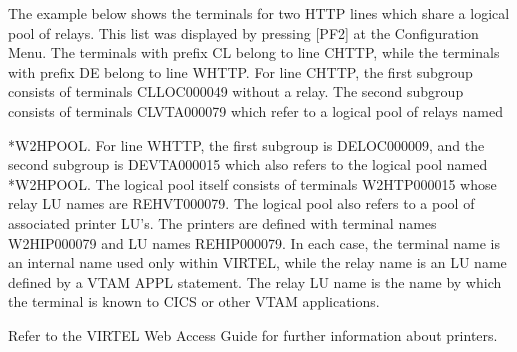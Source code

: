\documentclass[letterpaper,10pt,english]{sphinxmanual}
\begin{document}
\sphinxAtStartPar
The example below shows the terminals for two HTTP lines which share a logical pool of relays. This list was displayed by pressing {[}PF2{]} at the Configuration Menu. The terminals with prefix CL belong to line C\sphinxhyphen{}HTTP, while the terminals with prefix DE belong to line W\sphinxhyphen{}HTTP. For line C\sphinxhyphen{}HTTP, the first sub\sphinxhyphen{}group consists of terminals CLLOC000\sphinxhyphen{}049 without a relay. The second sub\sphinxhyphen{}group consists of terminals CLVTA000\sphinxhyphen{}079 which refer to a logical pool of relays named

\sphinxAtStartPar
*W2HPOOL. For line W\sphinxhyphen{}HTTP, the first sub\sphinxhyphen{}group is DELOC000\sphinxhyphen{}009, and the second sub\sphinxhyphen{}group is DEVTA000\sphinxhyphen{}015 which also refers to the logical pool named *W2HPOOL. The logical pool itself consists of terminals W2HTP000\sphinxhyphen{}015 whose relay LU names are REHVT000\sphinxhyphen{}079. The logical pool also refers to a pool of associated printer LU’s. The printers are defined with
terminal names W2HIP000\sphinxhyphen{}079 and LU names REHIP000\sphinxhyphen{}079. In each case, the terminal name is an internal name used only within VIRTEL, while the relay name is an LU name defined by a VTAM APPL statement. The relay LU name is the name by which the terminal is known to CICS or other VTAM applications.

\sphinxAtStartPar
{}

\sphinxAtStartPar
{}

\sphinxAtStartPar
{}

\sphinxAtStartPar
{}

\sphinxAtStartPar
{}

\sphinxAtStartPar
Refer to the VIRTEL Web Access Guide for further information about printers.

\ignorespaces 
\end{document}
